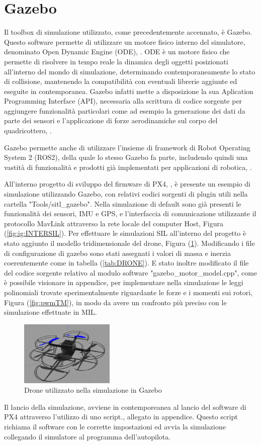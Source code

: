 \section{Gazebo}
\label{section:gazebo}

Il toolbox di simulazione utilizzato, come precedentemente accennato, è Gazebo. Questo software permette di utilizzare un motore fisico interno del simulatore, denominato Open Dynamic Engine (ODE), \cite{ODE}. ODE è un motore fisico che permette di risolvere in tempo reale la dinamica degli oggetti posizionati all'interno del mondo di simulazione, determinando contemporaneamente lo stato di collisione, mantenendo la compatibilità con eventuali librerie aggiunte ed eseguite in contemporanea. Gazebo infatti mette a disposizione la sua Aplication Programming Interface (API), necessaria alla scrittura di codice sorgente per aggiungere funzionalità particolari come ad esempio la generazione dei dati da parte dei sensori e l'applicazione di forze aerodinamiche sul corpo del quadricottero, \cite{Gazebo}. 

Gazebo permette anche di utilizzare l'insieme di framework di Robot Operating System 2 (ROS2), della quale lo stesso Gazebo fa parte, includendo quindi una vastità di funzionalità e prodotti già implementati per applicazioni di robotica, \cite{ROSGAZEBO}.

All'interno progetto di sviluppo del firmware di PX4, \cite{PX4FIRMWARE}, è presente un esempio di simulazione utilizzando Gazebo, con relativi codici sorgenti di plugin utili nella cartella "Tools/sitl\_gazebo". Nella simulazione di default sono già presenti le funzionalità dei sensori, IMU e GPS, e l'interfaccia di comunicazione utilizzante il protocollo MavLink attraverso la rete locale del computer Host, Figura (\ref{fig:ig:INTERSIL}).
Per effettuare le simulazioni SIL all'interno del progetto è stato aggiunto il modello tridimensionale del drone, Figura (\ref{fig:DRONECAD}). Modificando i file di configurazione di gazebo sono stati assegnati i valori di massa e inerzia coerentemente come in tabella (\ref{tab:DRONE}).
E stato inoltre modificato il file del codice sorgente relativo al modulo software "gazebo\_motor\_model.cpp", come è possibile visionare in appendice, per implementare nella simulazione le leggi polinomiali trovate sperimentalmente riguardante le forze e i momenti sui rotori, Figura (\ref{fig:pwmTM}), in modo da avere un confronto più preciso con le simulazione effettuate in MIL.

\begin{figure}
	\centering
	\includegraphics[width=0.4\textwidth]{DescrizioneAutopilota/Figure/DRONECAD}
	\caption{Drone utilizzato nella simulazione in Gazebo}
	\label{fig:DRONECAD}
\end{figure}

Il lancio della simulazione, avviene in contemporeanea al lancio del software di PX4 attraverso l'utilizzo di uno script., allegato in appendice. Questo script richiama il software con le corrette impostazioni ed avvia la simulazione collegando il simulatore al programma dell'autopilota.
